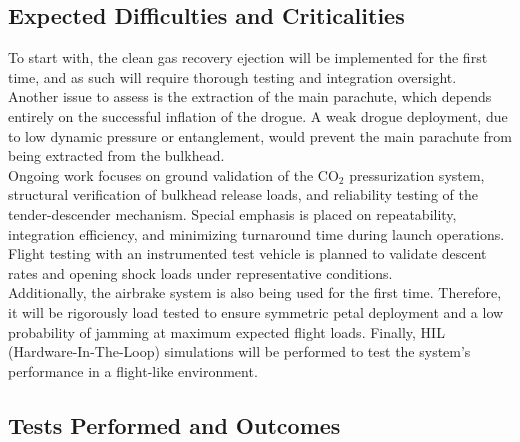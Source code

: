 \documentclass[11pt,a4paper]{article}
\begin{document}
\subsection{Expected Difficulties and Criticalities}
To start with, the clean gas recovery ejection will be implemented for the first time, and as such will require thorough testing and integration oversight.\\

Another issue to assess is the extraction of the main parachute, which depends entirely on the successful inflation of the drogue. A weak drogue deployment, due to low dynamic pressure or entanglement, would prevent the main parachute from being extracted from the bulkhead.\\

Ongoing work focuses on ground validation of the CO$_2$ pressurization system, structural verification of bulkhead release loads, and reliability testing of the tender-descender mechanism. Special emphasis is placed on repeatability, integration efficiency, and minimizing turnaround time during launch operations. Flight testing with an instrumented test vehicle is planned to validate descent rates and opening shock loads under representative conditions.\\

Additionally, the airbrake system is also being used for the first time. Therefore, it will be rigorously load tested to ensure symmetric petal deployment and a low probability of jamming at maximum expected flight loads. Finally, HIL (Hardware-In-The-Loop) simulations will be performed to test the system’s performance in a flight-like environment. 


\subsection{Tests Performed and Outcomes}
\label{Tests_Performed} 
\end{document}
